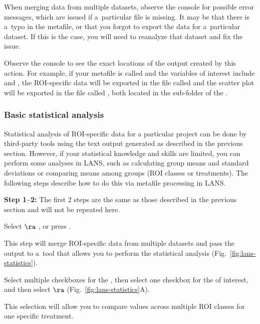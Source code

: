 \bul When merging data from multiple datasets, observe the console for possible error messages, which are issued if a~particular file is missing. It may be that there is a~typo in the metafile, or that you forgot to export the data for a~particular dataset. If this is the case, you will need to reanalyze that dataset and fix the issue.

\bul Observe the console to see the exact locations of the output created by this action. For example, if your metafile is called  and the variables of interest include  and , the ROI-specific data will be exported in the file called  and the scatter plot will be exported in the file called , both located in the sub-folder  of the .

\subsubsection{Basic statistical analysis}

Statistical analysis of ROI-specific data for a particular project can be done by third-party tools using the text output generated as described in the previous section.  However, if your statistical knowledge and skills are limited, you can perform some  analyses in LANS, such as calculating group means and standard deviations or comparing means among groups (ROI classes or treatments). The following steps describe how to do this via metafile processing in LANS.

\vskip5pt\noindent\textbf{Step 1--2:} The first 2 steps are the same as those described in the previous section and will not be repeated here.

\setcounter{step}{2}
\s Select  $\ra$ , or press .

\bul This step will merge ROI-specific data from multiple datasets and pass the output to a~tool that allows you to perform the statistical analysis (Fig.~\ref{fig:lans-statistics}).

\s Select multiple checkboxes for the , then select one checkbox for the  of interest,  and then select  $\ra$  (Fig.~\ref{fig:lans-statistics}A).

\bul This selection will allow you to compare values across multiple ROI classes for one specific treatment.

